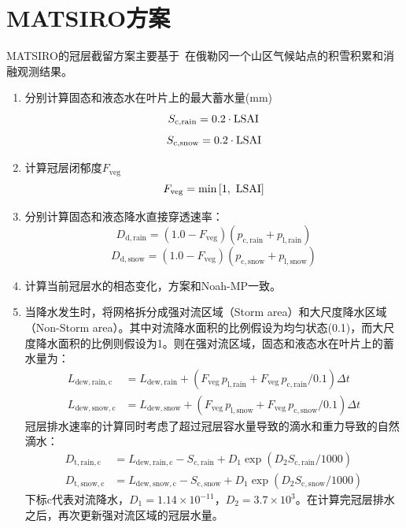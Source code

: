 \section{MATSIRO方案}
MATSIRO的冠层截留方案主要基于~\cite{storck2002measurement}在俄勒冈一个山区气候站点的积雪积累和消融观测结果。
\begin{enumerate}
  \item 分别计算固态和液态水在叶片上的最大蓄水量(mm)
    \begin{equation}
      S_{\mathrm{c,rain}}=0.2\cdot{\rm LSAI}
    \end{equation}
    \begin{equation}
      S_{\mathrm{c,snow}}=0.2\cdot{\rm LSAI}
    \end{equation}

  \item 计算冠层闭郁度$F_{\mathrm{veg}}$
    \begin{equation}
      F_{\mathrm{veg}} = \min\left[1,~ {\rm LSAI}\right]
    \end{equation}

  \item 分别计算固态和液态降水直接穿透速率：
    \begin{equation}
      D_{\mathrm{d,rain}}=\left(1.0-F_{\mathrm{veg}}\right)  (p_{\mathrm{c,rain}}+p_{\mathrm{l,rain}})
    \end{equation}
    \begin{equation}
      D_{\mathrm{d,snow}}=\left(1.0-F_{\mathrm{veg}}\right)  (p_{\mathrm{c,snow}}+p_{\mathrm{l,snow}})
    \end{equation}
  \item 计算当前冠层水的相态变化，方案和Noah-MP一致。

  \item 当降水发生时，将网格拆分成强对流区域（Storm area）和大尺度降水区域（Non-Storm area）。其中对流降水面积的比例假设为均匀状态(0.1)，而大尺度降水面积的比例则假设为1。则在强对流区域，固态和液态水在叶片上的蓄水量为：
    \begin{align}
      L_{\mathrm{dew,rain,c}} &= L_{\mathrm{dew,rain}}+\left(F_{\mathrm{veg}}\,p_{\mathrm{l,rain}} + F_{\mathrm{veg}}\,p_{\mathrm{c,rain}}/0.1\right)\Delta t \\[2.2ex]
      L_{\mathrm{dew,snow,c}} &= L_{\mathrm{dew,snow}}+\left(F_{\mathrm{veg}}\,p_{\mathrm{l,snow}} + F_{\mathrm{veg}}\,p_{\mathrm{c,snow}}/0.1\right)\Delta t
    \end{align}
    冠层排水速率的计算同时考虑了超过冠层容水量导致的滴水和重力导致的自然滴水：
    \begin{align}
      D_{\mathrm{t,rain,c}} &= L_{\mathrm{dew,rain,c}} -S_{\mathrm{c,rain}} + D_{1} \exp\left(D_{2} S_{\mathrm{c,rain}}/1000\right) \\[2.2ex]
      D_{\mathrm{t,snow,c}} &= L_{\mathrm{dew,snow,c}} - S_{\mathrm{c,snow}} + D_{1} \exp\left(D_{2} S_{\mathrm{c,snow}}/1000\right)
    \end{align}
    下标${\mathrm{c}}$代表对流降水，$D_{1}=1.14 \times 10^{-11}$，$D_{2}=3.7 \times 10^{3}$。在计算完冠层排水之后，再次更新强对流区域的冠层水量。


\end{enumerate}
